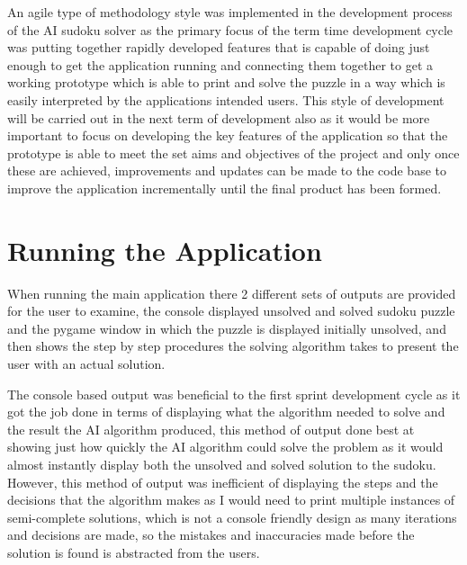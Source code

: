 \documentclass[]{final_report}
\begin{document}
An agile type of methodology style was implemented in the development process of the AI sudoku solver as the primary focus of the term time development cycle was putting together rapidly developed features that is capable of doing just enough to get the application running and connecting them together to get a working prototype which is able to print and solve the puzzle in a way which is easily interpreted by the applications intended users. This style of development will be carried out in the next term of development also as it would be more important to focus on developing the key features of the application so that the prototype is able to meet the set aims and objectives of the project and only once these are achieved, improvements and updates can be made to the code base to improve the application incrementally until the final product has been formed. 

\section{Running the Application}

When running the main application there 2 different sets of outputs are provided for the user to examine, the console displayed unsolved and solved sudoku puzzle and the pygame window in which the puzzle is displayed initially unsolved, and then shows the step by step procedures the solving algorithm takes to present the user with an actual solution. 

The console based output was beneficial to the first sprint development cycle as it got the job done in terms of displaying what the algorithm needed to solve and the result the AI algorithm produced, this method of output done best at showing just how quickly the AI algorithm could solve the problem as it would almost instantly display both the unsolved and solved solution to the sudoku. However, this method of output was inefficient of displaying the steps and the decisions that the algorithm makes as I would need to print multiple instances of semi-complete solutions, which is not a console friendly design as many iterations and decisions are made, so the mistakes and inaccuracies made before the solution is found is abstracted from the users. 
\end{document}
